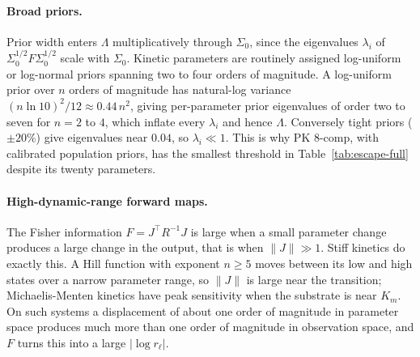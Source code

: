 \paragraph{Broad priors.}
Prior width enters $\Lambda$ multiplicatively through $\Sigma_0$, since the
eigenvalues $\lambda_i$ of $\Sigma_0^{1/2}F\Sigma_0^{1/2}$ scale with $\Sigma_0$.
Kinetic parameters are routinely assigned log-uniform or log-normal priors spanning
two to four orders of magnitude. A log-uniform prior over $n$ orders of magnitude has
natural-log variance $(n\ln10)^2/12\approx0.44\,n^2$, giving per-parameter prior
eigenvalues of order two to seven for $n=2$ to $4$, which inflate every $\lambda_i$
and hence $\Lambda$. Conversely tight priors ($\pm20\%$) give eigenvalues near
$0.04$, so $\lambda_i\ll1$. This is why PK 8-comp, with calibrated population priors,
has the smallest threshold in Table~\ref{tab:escape-full} despite its twenty
parameters.

\paragraph{High-dynamic-range forward maps.}
The Fisher information $F=J^\top R^{-1}J$ is large when a small parameter change
produces a large change in the output, that is when $\|J\|\gg1$. Stiff kinetics do
exactly this. A Hill function with exponent $n\ge5$ moves between its low and high
states over a narrow parameter range, so $\|J\|$ is large near the transition;
Michaelis-Menten kinetics have peak sensitivity when the substrate is near $K_m$. On
such systems a displacement of about one order of magnitude in parameter space
produces much more than one order of magnitude in observation space, and $F$ turns
this into a large $|\log r_\ell|$.

